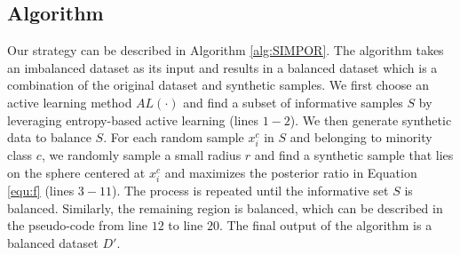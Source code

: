 \subsection{Algorithm}
Our strategy can be described in Algorithm \ref{alg:SIMPOR}. The algorithm takes an imbalanced dataset as its input and results in a balanced dataset which is a combination of the original dataset and synthetic samples. We first choose an active learning method $AL(\cdot)$ and find a subset of informative samples $S$ by leveraging entropy-based active learning (lines $1-2$). We then generate synthetic data to balance $S$. For each random sample $x_i^c$ in $S$ and belonging to minority class $c$, we randomly sample a small radius $r$ and find a synthetic sample that lies on the sphere centered at $x_i^c$ and maximizes the posterior ratio in Equation \ref{equ:f} (lines $3-11$). The process is repeated until the informative set $S$ is balanced. Similarly, the remaining region is balanced, which can be described in the pseudo-code from line $12$ to line $20$. The final output of the algorithm is a balanced dataset $D'$.       

